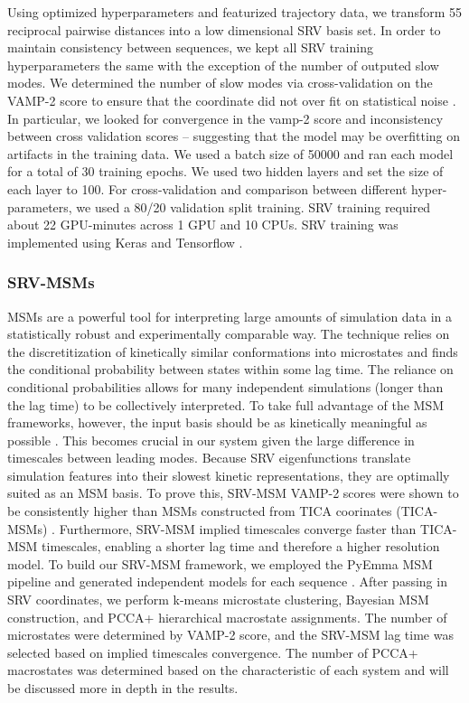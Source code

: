 \documentclass[journal=jpcbfk,manuscript=article]{achemso}
\begin{document}
Using optimized hyperparameters and featurized trajectory data, we transform 55 reciprocal pairwise distances into a low dimensional SRV basis set. In order to maintain consistency between sequences, we kept all SRV training hyperparameters the same with the exception of the number of outputed slow modes. We determined the number of slow modes via cross-validation on the VAMP-2 score to ensure that the coordinate did not over fit on statistical noise \citep{McGibbon2015VariationalKinetics}. In particular, we looked for convergence in the vamp-2 score and inconsistency between cross validation scores -- suggesting that the model may be overfitting on artifacts in the training data. We used a batch size of 50000 and ran each model for a total of 30 training epochs. We used two hidden layers and set the size of each layer to 100. For cross-validation and comparison between different hyper-parameters, we used a 80/20 validation split training. SRV training required about 22 GPU-minutes across 1 GPU and 10 CPUs. SRV training was implemented using Keras and Tensorflow \citep{KerasGithub.Com, Abadi2016TensorFlow:Systems}.

\subsubsection{\label{sec:methods}SRV-MSMs}

MSMs are a powerful tool for interpreting large amounts of simulation data in a statistically robust and experimentally comparable way. The technique relies on the discretitization of kinetically similar conformations into microstates and finds the conditional probability between states within some lag time. The reliance on conditional probabilities allows for many independent simulations (longer than the lag time) to be collectively interpreted. To take full advantage of the MSM frameworks, however, the input basis should be as kinetically meaningful as possible \citep{Pande2010EverythingAsk}. This becomes crucial in our system given the large difference in timescales between leading modes. Because SRV eigenfunctions translate simulation features into their slowest kinetic representations, they are optimally suited as an MSM basis. To prove this, SRV-MSM VAMP-2 scores were shown to be consistently higher than MSMs constructed from TICA coorinates (TICA-MSMs) \citep{Sidky}. Furthermore, SRV-MSM implied timescales converge faster than TICA-MSM timescales, enabling a shorter lag time and therefore a higher resolution model. To build our SRV-MSM framework, we employed the PyEmma MSM pipeline and generated independent models for each sequence \citep{Scherer2015PyEMMAModels}. After passing in SRV coordinates, we perform k-means microstate clustering, Bayesian MSM construction, and PCCA+ hierarchical macrostate assignments. The number of microstates were determined by VAMP-2 score, and the SRV-MSM lag time was selected based on implied timescales convergence.  The number of PCCA+ macrostates was determined based on the characteristic of each system and will be discussed more in depth in the results. 
\end{document}

